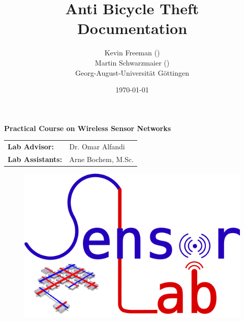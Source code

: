 \documentclass[a4paper]{article}
\title{\textbf{Anti Bicycle Theft}\bigskip\\Documentation}
\author{Kevin Freeman (\matone)\\ Martin Schwarzmaier (\mattwo)\\Georg-August-Universität Göttingen}
\date{\today}
\begin{document}
\setlength\parindent{0pt}
\maketitle
\begin{center}
	\textbf{Practical Course on Wireless Sensor Networks}
\end{center}\vspace{10em}
\begin{center}
	\begin{tabular}{ll}
	\textbf{Lab Advisor: }&Dr. Omar Alfandi\\
	\textbf{Lab Assistants: }&Arne Bochem, M.Sc.
	\end{tabular}
\end{center}

\begin{figure}[b]
	\centering
	\includegraphics[scale=1]{logo.png} %
\end{figure}

\thispagestyle{empty} %
\newpage

\tableofcontents
\thispagestyle{empty} %
\newpage

\setcounter{page}{1} %
\end{document}
